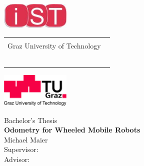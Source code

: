
\begin{titlepage}

  \begin{center}
    \begin{minipage}[htb]{18cm}
      \hspace*{-2.6cm}
      \includegraphics[width=3.3cm]{./figures/logos/IST.jpg}
      \begin{tabular}{p{10cm}}\centering{
      \Large Institute of Electrical Measurement and Measurement Signal Processing\\ Graz University of Technology
      ~\\
      ~\\}
      \end{tabular}
      \includegraphics[width=3.3cm]{./figures/logos/TUG.jpg}
    \end{minipage}

    \Large {Bachelor's Thesis\\} %
    \vspace*{1cm} \huge{\textbf{Odometry for Wheeled Mobile Robots}\\}
    \vspace*{1.0cm} 
    \Large{Michael Maier\\} \vspace*{1cm}
    \Large{Supervisor: \\} \vspace*{0.5cm}%
    \Large{Advisor: \\} \vspace*{1.5cm}%



\end{center}
\end{titlepage}
